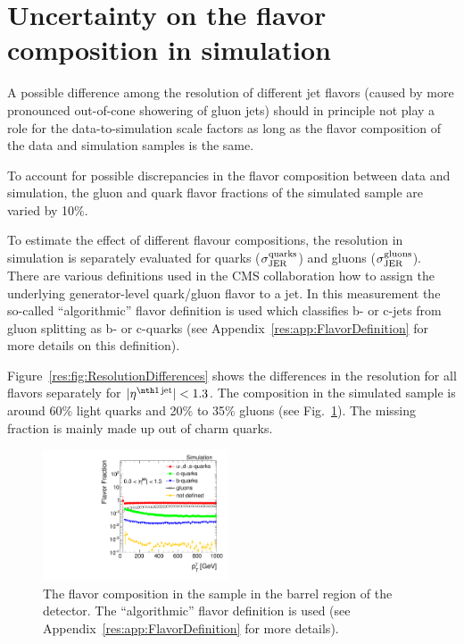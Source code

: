 \section*{Uncertainty on the flavor composition in simulation}
A possible difference among the resolution of different jet flavors (caused by \eg more pronounced out-of-cone showering of gluon jets) 
should in principle not play a role for the data-to-simulation scale factors \rhores as long as the flavor composition of the data and simulation samples is the same. 

To account for possible discrepancies in the flavor composition between data and simulation, the gluon and quark flavor fractions of the simulated sample are varied by 10\%.



To estimate the effect of different flavour compositions, the resolution in simulation is separately evaluated for quarks ($\sigma_\mathrm{JER}^\text{quarks}$) and gluons ($\sigma_\mathrm{JER}^\text{gluons}$). 
There are various definitions used in the CMS collaboration how to assign the underlying generator-level quark/gluon flavor to a jet.
In this measurement the so-called ``algorithmic'' flavor definition is used which classifies b- or c-jets from gluon splitting as b- or c-quarks (see Appendix~\ref{res:app:FlavorDefinition} for more details on this definition).

Figure~\ref{res:fig:ResolutionDifferences} shows the differences in the resolution for all flavors separately for $|\etafirstjet|<1.3$.
The composition in the simulated \pythia \GAMJET sample is around 60\% light quarks and 20\% to 35\% gluons (see Fig.~\ref{res:fig:FlavorFraction}). 
The missing fraction is mainly made up out of charm quarks. 
\begin{figure}[t]
  \centering
      \includegraphics[width=0.49\textwidth]{figures/resolution/systematicUncertainties/flavorFraction_barrel_algo.pdf}
  \caption{The flavor composition in the \GAMJET sample in the barrel region of the detector. The ``algorithmic'' flavor definition is used (see Appendix~\ref{res:app:FlavorDefinition} for more details).}  
  \label{res:fig:FlavorFraction}
\end{figure}

